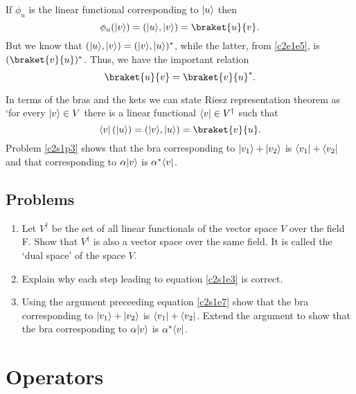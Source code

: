 If $\phi_u$ is the linear functional corresponding to $\lvert u\rangle$ then
\[
\phi_u(\ket{v}) = (\ket{u}, \ket{v}) = \braket{u}{v}.
\]
But we know that $(\lvert u\rangle, \lvert v\rangle) = (\lvert v\rangle, \lvert u\rangle)^\ast$, while the 
latter, from \eqref{c2e1e5}, is $(\braket{v}{u})^\ast$. Thus, we have the 
important relation
\begin{equation}\label{c2e1e6}
\braket{u}{v} = \braket{v}{u}^\ast.
\end{equation}

In terms of the bras and the kets we can state Riesz representation theorem
as `for every $\lvert v\rangle\in V$ there is a linear functional $\langle v\rvert \in 
V^\dagger$ such that
\begin{equation}\label{c2s1e7}
\bra{v}\left(\ket{u}\right) = (\ket{v}, \ket{u}) = \braket{v}{u}.
\end{equation}
Problem \ref{c2s1p3} shows that the bra corresponding to $\lvert v_1\rangle + \lvert v_2\rangle$
is $\langle v_1\rvert + \langle v_2\rvert$ and that corresponding to $\alpha\lvert v\rangle$ is 
$\alpha^\ast\langle v\rvert$.


\subsection{Problems}
\begin{enumerate}
\item\label{c2s1p1} Let $V^\dagger$ be the set of all linear functionals of the 
vector space $V$ over the field F. Show that $V^\dagger$ is also a vector space 
over the same field. It is called the `dual space' of the space $V$.
\item Explain why each step leading to equation \eqref{c2s1e3} is correct.  
\item\label{c2s1p3} Using the argument preceeding equation \eqref{c2s1e7} show that the bra
corresponding to $\lvert v_1\rangle + \lvert v_2\rangle$ is $\langle v_1\rvert + \langle v_2\rvert$. Extend the
argument to show that the bra corresponding to $\alpha\lvert v\rangle$ is $\alpha^\ast
\langle v\rvert$.
\end{enumerate}

\section{Operators}\label{c2s2}
